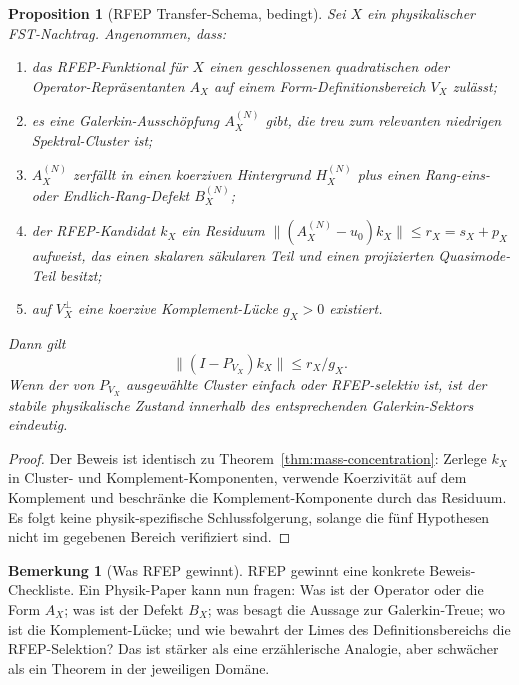 \documentclass[11pt,a4paper]{article}
\theoremstyle{plain}
\newtheorem{proposition}[theorem]{Proposition}
\theoremstyle{definition}
\newtheorem{remark}[theorem]{Bemerkung}
\begin{document}
\begin{proposition}[RFEP Transfer-Schema, bedingt]
\label{prop:rfep-transfer-schema}
Sei $X$ ein physikalischer FST-Nachtrag. Angenommen, dass:
\begin{enumerate}[leftmargin=*]
\item das RFEP-Funktional für $X$ einen geschlossenen quadratischen oder
  Operator-Repräsentanten $A_X$ auf einem Form-Definitionsbereich $V_X$ zulässt;
\item es eine Galerkin-Ausschöpfung $A_X^{(N)}$ gibt, die treu zum
  relevanten niedrigen Spektral-Cluster ist;
\item $A_X^{(N)}$ zerfällt in einen koerziven Hintergrund $H_X^{(N)}$ plus einen
  Rang-eins- oder Endlich-Rang-Defekt $B_X^{(N)}$;
\item der RFEP-Kandidat $k_X$ ein Residuum
  $\|(A_X^{(N)}-u_0)k_X\|\le r_X=s_X+p_X$ aufweist, das einen skalaren säkularen
  Teil und einen projizierten Quasimode-Teil besitzt;
\item auf $V_X^\perp$ eine koerzive Komplement-Lücke $g_X>0$ existiert.
\end{enumerate}
Dann gilt
\[
  \|(I-P_{V_X})k_X\|\le r_X/g_X.
\]
Wenn der von $P_{V_X}$ ausgewählte Cluster einfach oder RFEP-selektiv ist,
ist der stabile physikalische Zustand innerhalb des entsprechenden
Galerkin-Sektors eindeutig.
\end{proposition}

\begin{proof}
Der Beweis ist identisch zu Theorem~\ref{thm:mass-concentration}:
Zerlege $k_X$ in Cluster- und Komplement-Komponenten, verwende Koerzivität
auf dem Komplement und beschränke die Komplement-Komponente durch das Residuum.
Es folgt keine physik-spezifische Schlussfolgerung, solange die fünf
Hypothesen nicht im gegebenen Bereich verifiziert sind.
\end{proof}

\begin{remark}[Was RFEP gewinnt]
\label{rem:rfep-gain}
RFEP gewinnt eine konkrete Beweis-Checkliste. Ein Physik-Paper kann nun fragen:
Was ist der Operator oder die Form $A_X$; was ist der Defekt $B_X$; was
besagt die Aussage zur Galerkin-Treue; wo ist die Komplement-Lücke;
und wie bewahrt der Limes des Definitionsbereichs die RFEP-Selektion? Das ist
stärker als eine erzählerische Analogie, aber schwächer als ein Theorem in der jeweiligen Domäne.
\end{remark}
\end{document}

